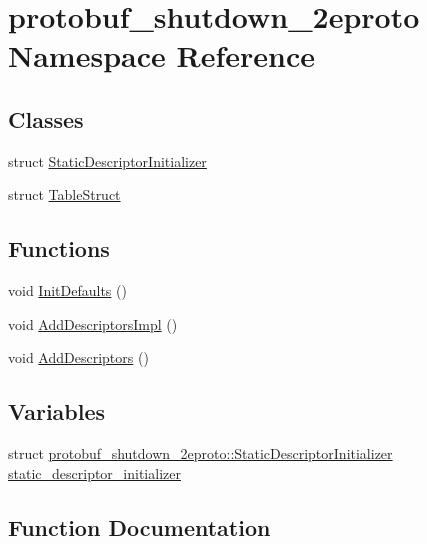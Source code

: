\hypertarget{namespaceprotobuf__shutdown__2eproto}{}\section{protobuf\+\_\+shutdown\+\_\+2eproto Namespace Reference}
\label{namespaceprotobuf__shutdown__2eproto}
\subsection*{Classes}
\begin{DoxyCompactItemize}
\item 
struct \hyperlink{structprotobuf__shutdown__2eproto_1_1_static_descriptor_initializer}{Static\+Descriptor\+Initializer}
\item 
struct \hyperlink{structprotobuf__shutdown__2eproto_1_1_table_struct}{Table\+Struct}
\end{DoxyCompactItemize}
\subsection*{Functions}
\begin{DoxyCompactItemize}
\item 
void \hyperlink{namespaceprotobuf__shutdown__2eproto_a74027734b8cea7f378100cf0b6cb4b58}{Init\+Defaults} ()
\item 
void \hyperlink{namespaceprotobuf__shutdown__2eproto_a729d370a71e6970c830fb554d8558f11}{Add\+Descriptors\+Impl} ()
\item 
void \hyperlink{namespaceprotobuf__shutdown__2eproto_a5437d9f43f254993a6bb3ad0d77f9d89}{Add\+Descriptors} ()
\end{DoxyCompactItemize}
\subsection*{Variables}
\begin{DoxyCompactItemize}
\item 
struct \hyperlink{structprotobuf__shutdown__2eproto_1_1_static_descriptor_initializer}{protobuf\+\_\+shutdown\+\_\+2eproto\+::\+Static\+Descriptor\+Initializer} \hyperlink{namespaceprotobuf__shutdown__2eproto_a01dfcfafd9651753066e44cd04be244d}{static\+\_\+descriptor\+\_\+initializer}
\end{DoxyCompactItemize}


\subsection{Function Documentation}
